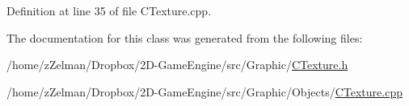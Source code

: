 Definition at line 35 of file C\-Texture.\-cpp.



The documentation for this class was generated from the following files\-:\begin{DoxyCompactItemize}
\item 
/home/z\-Zelman/\-Dropbox/2\-D-\/\-Game\-Engine/src/\-Graphic/\hyperlink{CTexture_8h}{C\-Texture.\-h}\item 
/home/z\-Zelman/\-Dropbox/2\-D-\/\-Game\-Engine/src/\-Graphic/\-Objects/\hyperlink{CTexture_8cpp}{C\-Texture.\-cpp}\end{DoxyCompactItemize}
